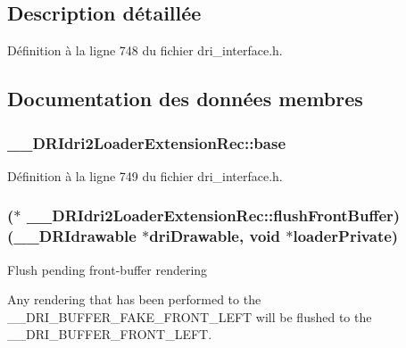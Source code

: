 \subsection{Description détaillée}


Définition à la ligne 748 du fichier dri\-\_\-interface.\-h.



\subsection{Documentation des données membres}
\hypertarget{struct_____d_r_idri2_loader_extension_rec_a017db553ff9b672e344aca9f6846711e}{
\subsubsection[{base}]{ \-\_\-\-\_\-\-D\-R\-Idri2\-Loader\-Extension\-Rec\-::base}}\label{struct_____d_r_idri2_loader_extension_rec_a017db553ff9b672e344aca9f6846711e}


Définition à la ligne 749 du fichier dri\-\_\-interface.\-h.

\hypertarget{struct_____d_r_idri2_loader_extension_rec_a0acfcc5a94fa38e1df5fba2c99f26d47}{
\subsubsection[{flush\-Front\-Buffer}]{($\ast$ \-\_\-\-\_\-\-D\-R\-Idri2\-Loader\-Extension\-Rec\-::flush\-Front\-Buffer)({\bf \-\_\-\-\_\-\-D\-R\-Idrawable} $\ast$dri\-Drawable, {\bf void} $\ast$loader\-Private)}}\label{struct_____d_r_idri2_loader_extension_rec_a0acfcc5a94fa38e1df5fba2c99f26d47}
Flush pending front-\/buffer rendering

Any rendering that has been performed to the {\ttfamily \-\_\-\-\_\-\-D\-R\-I\-\_\-\-B\-U\-F\-F\-E\-R\-\_\-\-F\-A\-K\-E\-\_\-\-F\-R\-O\-N\-T\-\_\-\-L\-E\-F\-T} will be flushed to the {\ttfamily \-\_\-\-\_\-\-D\-R\-I\-\_\-\-B\-U\-F\-F\-E\-R\-\_\-\-F\-R\-O\-N\-T\-\_\-\-L\-E\-F\-T}.


